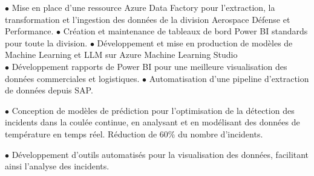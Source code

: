 \documentclass[theme]{cv_einstein}
\begin{document}
\begin{paracol}{2}
        \begin{rightcolumn}\noindent \small
            \hspace{-2.4pt}
            {$\bullet$ Mise en place d’une ressource Azure Data Factory pour l'extraction, la transformation et  l’ingestion des données de la division Aerospace Défense et
            Performance.\: \:\:\: \:\:\: \:\:\: \:\:\: \:\:\: \:\:\: \:\:\: \:\:\: \:\:\: \:\:\: \:\:\: \:\:\: \:\:\: \:\:\: \:\:\: \:\:\: \:\:\: \:\:\: \:\:\: \:\:\: \:\:\: \:\:\: \:\:\: \:\:\: \:\:\: \:\:\: \:\:\: \:\:\: \:\:\: \:\:\: \:\:\: \:\:\: \:\:\: \:\:\: \:\:\: 
            $\bullet$ Création et maintenance de tableaux de bord Power BI standards pour toute la division.
            \: \:\:\: \:\:\: \:\:\: \:\:\: \:\:\: \:\:\: \:\:\: \:\:\: \:\:\: \:\:\: \:\:\: \:\:\: \:\:\: \:\:\: \:\:\: \:\:\: \:\:\: \:\:\: \:\:\: \:\:\: \:\:\: \:\:\: \:\:\: \:\:\: \:\:\: \:\:\: \:\:\: \:\:\: \:\:\: \:\:\: \:\:\: \:\:\: \:\:\: \:\:\: \:\:\:
            $\bullet$ Développement et mise en production de modèles de Machine Learning et LLM sur Azure Machine Learning Studio}
            \vspace{0.01cm}\\
            {$\bullet$ Développement rapports de Power BI pour une meilleure visualisation des données commerciales et logistiques.
            \: \:\:\: \:\:\: \:\:\: \:\:\: \:\:\: \:\:\: \:\:\: \:\:\: \:\:\: \:\:\: \:\:\: \:\:\: \:\:\: \:\:\: \:\:\: \:\:\: \:\:\: \:\:\: \:\:\: \:\:\: \:\:\: \:\:\: \:\:\: \:\:\: \:\:\: \:\:\: \:\:\: \:\:\: \:\:\: \:\:\: \:\:\: \:\:\: \:\:\: \:\:\: \:\:\:
            $\bullet$ Automatisation d’une pipeline d’extraction de données depuis SAP.}
            \vspace{0.01cm}\\
            {$\bullet$ Conception de modèles de prédiction pour l’optimisation de la détection des incidents dans la coulée continue, en
            analysant et en modélisant des données de température en temps réel. Réduction de 60\% du nombre d’incidents.
            
            $\bullet$ Développement d’outils automatisés pour la visualisation des données, facilitant ainsi l’analyse des incidents.}


\end{rightcolumn}
\end{paracol}
\end{document}
